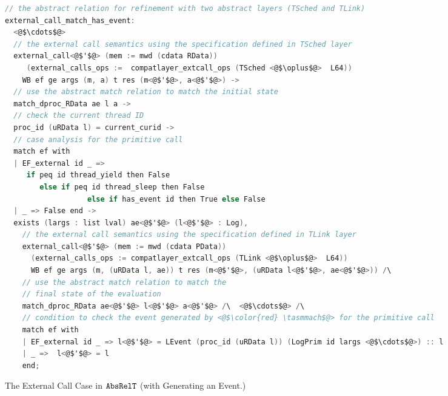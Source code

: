 \begin{figure}
\begin{lstlisting}[language=C]
// the abstract relation for refinement with two abstract layers (TSched and TLink)
external_call_match_has_event:
  <@$\cdots$@>
  // the external call semantics using the specification defined in TSched layer  
  external_call<@$'$@> (mem := mwd (cdata RData)) 
     (external_calls_ops :=  compatlayer_extcall_ops (TSched <@$\oplus$@>  L64))
    WB ef ge args (m, a) t res (m<@$'$@>, a<@$'$@>) ->
  // use the abstract match relation to match the initial state
  match_dproc_RData ae l a ->
  // check the current thread ID
  proc_id (uRData l) = current_curid ->
  // case analysis for the primitive call
  match ef with
  | EF_external id _ => 
     if peq id thread_yield then False
        else if peq id thread_sleep then False
                   else if has_event id then True else False
  | _ => False end -> 
  exists (largs : list lval) ae<@$'$@> (l<@$'$@> : Log),
    // the external call semantics using the specification defined in TLink layer
    external_call<@$'$@> (mem := mwd (cdata PData)) 
      (external_calls_ops := compatlayer_extcall_ops (TLink <@$\oplus$@>  L64))
      WB ef ge args (m, (uRData l, ae)) t res (m<@$'$@>, (uRData l<@$'$@>, ae<@$'$@>)) /\
    // use the abstract match relation to match the
    // final state of the evaluation      
    match_dproc_RData ae<@$'$@> l<@$'$@> a<@$'$@> /\  <@$\cdots$@> /\  
    // condition to check the event generated by <@$\color{red} \tasmmach$@> for the primitive call
    match ef with 
    | EF_external id _ => l<@$'$@> = LEvent (proc_id (uRData l)) (LogPrim id largs <@$\cdots$@>) :: l
    | _ =>  l<@$'$@> = l
    end;
\end{lstlisting}
\caption{The External Call Case in ${\mathrm{\texttt{AbsRelT}}}$ (with Generating an Event.)}
\label{fig:chapter:conlink:two-cases-of-abs-rel-t}
\end{figure}


